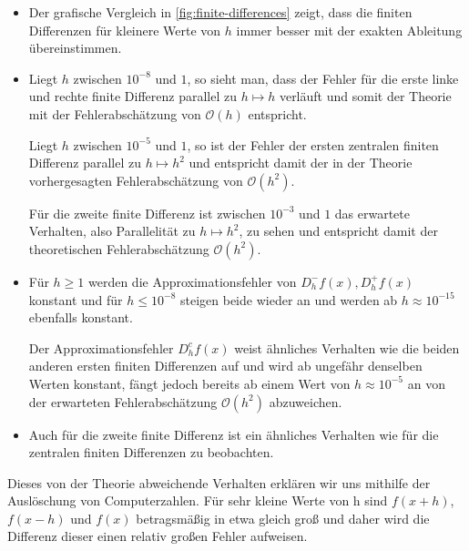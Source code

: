 \documentclass{scrartcl}
\newcommand{\BigO}{\mathcal{O}}
\theoremstyle{remark}
\begin{document}
\begin{itemize}
    \item Der grafische Vergleich in \autoref{fig:finite-differences} zeigt,
          dass die finiten Differenzen für kleinere Werte von \(h\) immer
          besser mit der exakten Ableitung übereinstimmen.

    \item Liegt \(h\) zwischen \(10^{-8}\) und \(1\), so sieht man, dass der
          Fehler für die erste linke und rechte finite Differenz parallel zu
          \(h \mapsto h\) verläuft und somit der Theorie mit der
          Fehlerabschätzung von \(\BigO(h)\) entspricht.

          Liegt \(h\) zwischen \(10^{-5}\) und \(1\), so ist der Fehler der
          ersten zentralen finiten Differenz parallel zu \(h \mapsto h^2\) und
          entspricht damit der in der Theorie vorhergesagten Fehlerabschätzung
          von \(\BigO(h^2)\).

          Für die zweite finite Differenz ist zwischen \(10^{-3}\) und \(1\)
          das erwartete Verhalten, also Parallelität zu \(h \mapsto h^2\), zu
          sehen und entspricht damit der theoretischen Fehlerabschätzung
          \(\BigO(h^2)\).

    \item Für \(h \ge 1\) werden die Approximationsfehler von \(D_h^- f(x),
          D_h^+ f(x)\) konstant und für \(h \le 10^{-8}\) steigen beide wieder
          an und werden ab \(h \approx 10^{-15}\) ebenfalls konstant.

          Der Approximationsfehler \(D_h^c f(x)\) weist ähnliches Verhalten wie
          die beiden anderen ersten finiten Differenzen auf und wird ab
          ungefähr denselben Werten konstant, fängt jedoch bereits ab einem
          Wert von \(h \approx 10^{-5}\) an von der erwarteten
          Fehlerabschätzung \(\BigO(h^2)\) abzuweichen.

    \item Auch für die zweite finite Differenz ist ein ähnliches Verhalten wie
          für die zentralen finiten Differenzen zu beobachten.
\end{itemize}

Dieses von der Theorie abweichende Verhalten erklären wir uns mithilfe der
Auslöschung von Computerzahlen. Für sehr kleine Werte von h sind \(f(x + h)\),
\(f(x - h)\) und \(f(x)\) betragsmäßig in etwa gleich groß und daher wird die
Differenz dieser einen relativ großen Fehler aufweisen.
\end{document}
